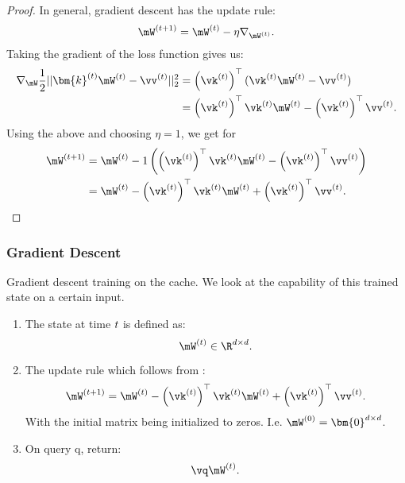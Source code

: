     \begin{proof}
        In general, gradient descent has the update rule:
        \begin{equation}\label{eq:update}
           \mW^{(\timestep+1)}=\mW^{(\timestep)}-\eta\nabla_{\mW^{(\timestep)}}.
        \end{equation}
        Taking the gradient of the loss function gives us:
        \begin{align*}
             \nabla_{\mW} \frac{1}{2}||\bm{k}^{(\timestep)}\mW^{(\timestep)}-\vv^{(\timestep)}||_{2}^{2} &= \left(\vk^{(\timestep)}\right)^{\top} (\vk^{(\timestep)}\mW^{(\timestep)}-\vv^{(\timestep)})\\
            &=\keyT{\timestep}\key{\timestep}\cacheMatrixTime{\timestep}-\keyT{\timestep}\val{\timestep}.
        \end{align*}
        Using the above and choosing $\eta=1$, we get for 
        \begin{align*}
            \cacheMatrixTime{\timestep+1} &= \cacheMatrixTime{\timestep}-1\left(\keyT{\timestep}\key{\timestep}\cacheMatrixTime{\timestep}-\keyT{\timestep}\val{\timestep}\right)\\
            &=\cacheMatrixTime{\timestep}-\keyT{\timestep}\key{\timestep}\cacheMatrixTime{\timestep}+\keyT{\timestep}\val{\timestep} .\\
        \end{align*}
   \end{proof}
\subsubsection{Gradient Descent}
Gradient descent training on the cache. We look at the capability of this trained state on a certain input.
\begin{enumerate}[leftmargin=*]
    \item The state at time $t$ is defined as: \[\cacheMatrixTime{\timestep}\in\R^{\modelDim\times\modelDim}.\]
    \item The update rule which follows from :
    \[\cacheMatrixTime{\timestep+1}=\cacheMatrixTime{\timestep}-\keyT{\timestep}\key{\timestep}\cacheMatrixTime{\timestep}+\keyT{\timestep}\val{\timestep}.\] With the initial matrix being initialized to zeros. I.e. $\cacheMatrixTime{0} = \bm{0}^{\modelDim\times\modelDim}$.
    \item On query q, return:
    \[\vq\mW^{(\timestep)}.\]
\end{enumerate}
